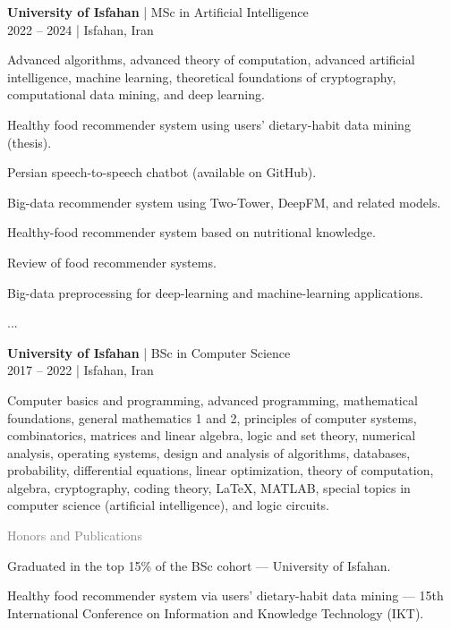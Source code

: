 \documentclass[a4paper]{deedy-resume}
\begin{document}
\begin{minipage}[t]{0.62\textwidth}
\textbf{University of Isfahan} | MSc in Artificial Intelligence \\
\vspace{\itemsep}
2022 – 2024 | Isfahan, Iran
\vspace{\itemsep}
\begin{tightitemize}
\item Advanced algorithms, advanced theory of computation, advanced artificial intelligence, machine learning, theoretical foundations of cryptography, computational data mining, and deep learning.
\item Healthy food recommender system using users' dietary-habit data mining (thesis).
\item Persian speech-to-speech chatbot (available on GitHub).
\item Big-data recommender system using Two-Tower, DeepFM, and related models.
\item Healthy-food recommender system based on nutritional knowledge.
\item Review of food recommender systems.
\item Big-data preprocessing for deep-learning and machine-learning applications.
\item ...
\end{tightitemize}
\sectionspace

\textbf{University of Isfahan} | BSc in Computer Science \\
\vspace{\itemsep}
2017 – 2022 | Isfahan, Iran
\begin{tightitemize}
\item Computer basics and programming, advanced programming, mathematical foundations, general mathematics 1 and 2, principles of computer systems, combinatorics, matrices and linear algebra, logic and set theory, numerical analysis, operating systems, design and analysis of algorithms, databases, probability, differential equations, linear optimization, theory of computation, algebra, cryptography, coding theory, LaTeX, MATLAB, special topics in computer science (artificial intelligence), and logic circuits.
\end{tightitemize}
\sectionspace

\textcolor{gray}{\huge{Honors and Publications}}
\vspace{\itemsep}
\begin{tightitemize}
\item Graduated in the top 15\% of the BSc cohort — University of Isfahan.
\item Healthy food recommender system via users' dietary-habit data mining — 15th International Conference on Information and Knowledge Technology (IKT).
\end{tightitemize}
\sectionspace


\end{minipage}
\end{document}
